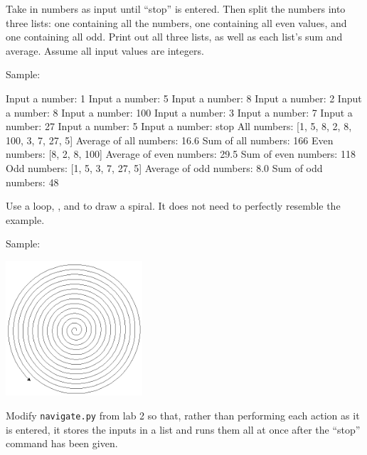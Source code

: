 \documentclass[11pt]{cselabheader}
\begin{document}
\begin{ex}[parity.py] Take in numbers as input until ``stop'' is entered. Then
  split the numbers into three lists: one containing all the numbers, one
  containing all even values, and one containing all odd. Print out all three
  lists, as well as each list's sum and average. Assume all input values are
  integers.

  Sample:

\begin{verbatimcode}
Input a number: 1
Input a number: 5
Input a number: 8
Input a number: 2
Input a number: 8
Input a number: 100
Input a number: 3
Input a number: 7
Input a number: 27
Input a number: 5
Input a number: stop
All numbers: [1, 5, 8, 2, 8, 100, 3, 7, 27, 5]
Average of all numbers: 16.6
Sum of all numbers: 166
Even numbers: [8, 2, 8, 100]
Average of even numbers: 29.5
Sum of even numbers: 118
Odd numbers: [1, 5, 3, 7, 27, 5]
Average of odd numbers: 8.0
Sum of odd numbers: 48
\end{verbatimcode}
\end{ex}

\begin{ex}[spiral.py] Use a  loop, , and
   to draw a spiral. It does not need to perfectly resemble
  the example.

  Sample:
  \begin{center}
    \includegraphics[width=2.0in]{img/spiral}
  \end{center}
\end{ex}

\begin{ex}[navigate2.py] Modify \texttt{navigate.py} from lab 2 so that,
  rather than performing each action as it is entered, it stores the inputs in a
  list and runs them all at once after the ``stop'' command has been given.
\end{ex}
\end{document}
